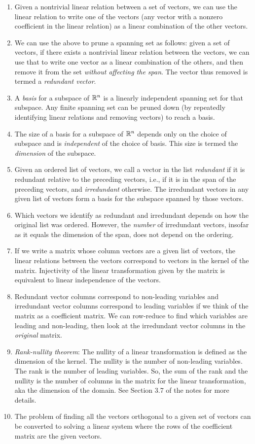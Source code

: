 \documentclass[10pt]{amsart}
\begin{document}
\begin{enumerate}
\item Given a nontrivial linear relation between a set of vectors, we
  can use the linear relation to write one of the vectors (any vector
  with a nonzero coefficient in the linear relation) as a linear
  combination of the other vectors.
\item We can use the above to prune a spanning set as follows: given a
  set of vectors, if there exists a nontrivial linear relation between
  the vectors, we can use that to write one vector as a linear
  combination of the others, and then remove it from the set {\em
    without affecting the span}. The vector thus removed is termed a
  {\em redundant vector}.
\item A {\em basis} for a subspace of $\mathbb{R}^n$ is a linearly independent
  spanning set for that subspace. Any finite spanning set can be
  pruned down (by repeatedly identifying linear relations and removing
  vectors) to reach a basis.
\item The size of a basis for a subspace of $\mathbb{R}^n$ depends only on the
  choice of subspace and is {\em independent} of the choice of
  basis. This size is termed the {\em dimension} of the subspace.
\item Given an ordered list of vectors, we call a vector in the list
  {\em redundant} if it is redundant relative to the preceding
  vectors, i.e., if it is in the span of the preceding vectors, and
  {\em irredundant} otherwise. The irredundant vectors in any given
  list of vectors form a basis for the subspace spanned by those
  vectors.
\item Which vectors we identify as redundant and irredundant depends
  on how the original list was ordered. However, the {\em number} of
  irredundant vectors, insofar as it equals the dimension of the span,
  does not depend on the ordering.
\item If we write a matrix whose column vectors are a given list of
  vectors, the linear relations between the vectors correspond to
  vectors in the kernel of the matrix. Injectivity of the linear
  transformation given by the matrix is equivalent to linear
  independence of the vectors.
\item Redundant vector columns correspond to non-leading variables and
  irredundant vector columns correspond to leading variables if we
  think of the matrix as a coefficient matrix. We can row-reduce to
  find which variables are leading and non-leading, then look at the
  irredundant vector columns in the {\em original} matrix.
\item {\em Rank-nullity theorem}: The nullity of a linear transformation
  is defined as the dimension of the kernel. The nullity is the number
  of non-leading variables. The rank is the number of leading
  variables. So, the sum of the rank and the nullity is the number of
  columns in the matrix for the linear transformation, aka the
  dimension of the domain. See Section 3.7 of the notes for more details.
\item The problem of finding all the vectors orthogonal to a given set
  of vectors can be converted to solving a linear system where the
  rows of the coefficient matrix are the given vectors.
\end{enumerate}
\end{document}
